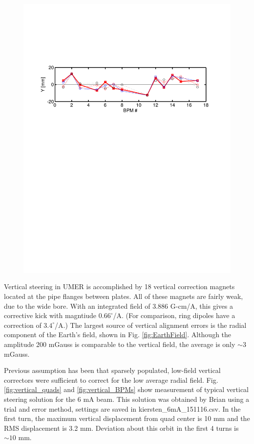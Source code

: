 \begin{figure}[h]
{	\includegraphics[width=\textwidth,trim={.5in 6.5in .5in 2.4in}, clip]{3.figures/BPM_position_sol151116_Y.pdf}}
\end{figure}

Vertical steering in UMER is accomplished by 18 vertical correction magnets located at the pipe flanges between plates. All of these magnets are fairly weak, due to the wide bore. With an integrated field of 3.886 G-cm/A, this gives a corrective kick with magntiude $0.66^{\circ}$/A. (For comparison, ring dipoles have a correction of $3.4^{\circ}$/A.) The largest source of vertical alignment errors is the radial component of the Earth's field, shown in Fig. \ref{fig:EarthField}. Although the amplitude 200 mGauss is comparable to the vertical field, the average is only $\sim3$ mGauss.

Previous assumption has been that sparsely populated, low-field vertical correctors were sufficient to correct for the low average radial field. Fig. \ref{fig:vertical_quads} and \ref{fig:vertical_BPMs} show measurement of typical vertical steering solution for the 6 mA beam. This solution was obtained by Brian using a trial and error method, settings are saved in kiersten\_6mA\_151116.csv. In the first turn, the maximum vertical displacement from quad center is 10 mm and the RMS displacement is 3.2 mm. Deviation about this orbit in the first 4 turns is $\sim10$ mm. 

